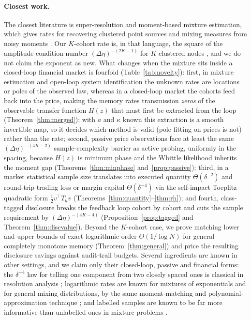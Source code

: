 \documentclass[12pt]{article}
\theoremstyle{definition}
\theoremstyle{remark}
\begin{document}
\paragraph{Closest work.} The closest literature is super-resolution and moment-based mixture estimation, which gives rates for recovering clustered point sources and mixing measures from noisy moments \citep{moitra2015,heinrich2018,batenkov2021,liu2023,wu2020,kong2017}. Our $K$-cohort rate is, in that language, the square of the amplitude condition number $(\Delta\eta)^{-(2K-1)}$ for $K$ clustered nodes \citep{heinrich2018,wu2020}, and we do not claim the exponent as new. What changes when the mixture sits inside a closed-loop financial market is fourfold (Table~\ref{tab:novelty}): first, in mixture estimation and open-loop system identification the unknown rates are locations or poles of the observed law, whereas in a closed-loop market the cohorts feed back into the price, making the memory rates transmission \emph{zeros} of the observable transfer function $H(z)$ that must first be extracted from the loop (Theorem~\ref{thm:merged}); with $a$ and $\kappa$ known this extraction is a smooth invertible map, so it decides which method is valid (pole fitting on prices is not) rather than the rate; second, passive price observations face at least the same $(\Delta\eta)^{-(4K-2)}$ sample-complexity barrier as active probing, uniformly in the spacing, because $H(z)$ is minimum phase and the Whittle likelihood inherits the moment gap (Theorems~\ref{thm:minphase} and~\ref{prop:passive}); third, in a market statistical sample size translates into executed quantity $\Theta(\delta^{-2})$ and round-trip trading loss or margin capital $\Theta(\delta^{-4})$ via the self-impact Toeplitz quadratic form $\tfrac12 v^\top T_h v$ (Theorems~\ref{thm:quantity}--\ref{thm:rh}); and fourth, class-tagged disclosure breaks the feedback loop cohort by cohort and cuts the sample requirement by $(\Delta\eta)^{-(4K-4)}$ (Proposition~\ref{prop:tagged} and Theorem~\ref{thm:discvalue}). Beyond the $K$-cohort case, we prove matching lower and upper bounds of exact logarithmic order $\Theta(1/\log N)$ for general completely monotone memory (Theorem~\ref{thm:general}) and price the resulting disclosure savings against audit-trail budgets. Several ingredients are known in other settings, and we claim only their closed-loop, passive and financial forms: the $\delta^{-4}$ law for telling one component from two closely spaced ones is classical in resolution analysis \citep{shahram2005}; logarithmic rates are known for mixtures of exponentials \citep{rebafka2015} and for general mixing distributions, by the same moment-matching and polynomial-approximation technique \citep{wu2020}; and labelled samples are known to be far more informative than unlabelled ones in mixture problems \citep{castelli1996}.
\end{document}
